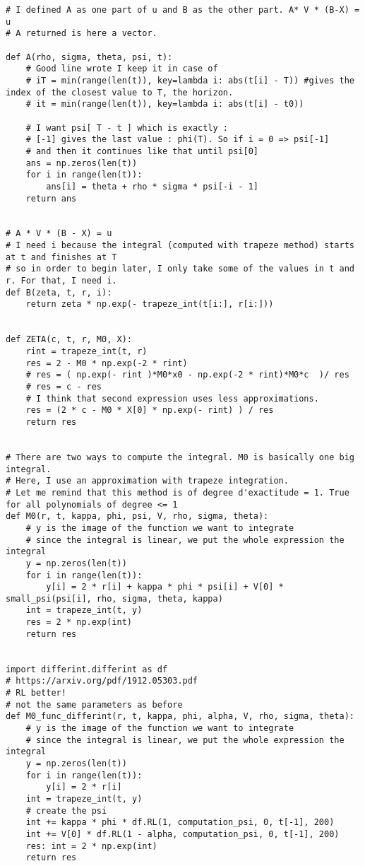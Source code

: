 \begin{Verbatim}[fontsize=\tiny]
# I defined A as one part of u and B as the other part. A* V * (B-X) = u
# A returned is here a vector.

def A(rho, sigma, theta, psi, t):
    # Good line wrote I keep it in case of
    # iT = min(range(len(t)), key=lambda i: abs(t[i] - T)) #gives the index of the closest value to T, the horizon.
    # it = min(range(len(t)), key=lambda i: abs(t[i] - t0))

    # I want psi[ T - t ] which is exactly :
    # [-1] gives the last value : phi(T). So if i = 0 => psi[-1]
    # and then it continues like that until psi[0]
    ans = np.zeros(len(t))
    for i in range(len(t)):
        ans[i] = theta + rho * sigma * psi[-i - 1]
    return ans


# A * V * (B - X) = u
# I need i because the integral (computed with trapeze method) starts at t and finishes at T
# so in order to begin later, I only take some of the values in t and r. For that, I need i.
def B(zeta, t, r, i):
    return zeta * np.exp(- trapeze_int(t[i:], r[i:]))


def ZETA(c, t, r, M0, X):
    rint = trapeze_int(t, r)
    res = 2 - M0 * np.exp(-2 * rint)
    # res = ( np.exp(- rint )*M0*x0 - np.exp(-2 * rint)*M0*c  )/ res
    # res = c - res
    # I think that second expression uses less approximations.
    res = (2 * c - M0 * X[0] * np.exp(- rint) ) / res
    return res


# There are two ways to compute the integral. M0 is basically one big integral.
# Here, I use an approximation with trapeze integration.
# Let me remind that this method is of degree d'exactitude = 1. True for all polynomials of degree <= 1
def M0(r, t, kappa, phi, psi, V, rho, sigma, theta):
    # y is the image of the function we want to integrate
    # since the integral is linear, we put the whole expression the integral
    y = np.zeros(len(t))
    for i in range(len(t)):
        y[i] = 2 * r[i] + kappa * phi * psi[i] + V[0] * small_psi(psi[i], rho, sigma, theta, kappa)
    int = trapeze_int(t, y)
    res = 2 * np.exp(int)
    return res


import differint.differint as df
# https://arxiv.org/pdf/1912.05303.pdf
# RL better!
# not the same parameters as before
def M0_func_differint(r, t, kappa, phi, alpha, V, rho, sigma, theta):
    # y is the image of the function we want to integrate
    # since the integral is linear, we put the whole expression the integral
    y = np.zeros(len(t))
    for i in range(len(t)):
        y[i] = 2 * r[i]
    int = trapeze_int(t, y)
    # create the psi
    int += kappa * phi * df.RL(1, computation_psi, 0, t[-1], 200)
    int += V[0] * df.RL(1 - alpha, computation_psi, 0, t[-1], 200)
    res: int = 2 * np.exp(int)
    return res







\end{Verbatim}
